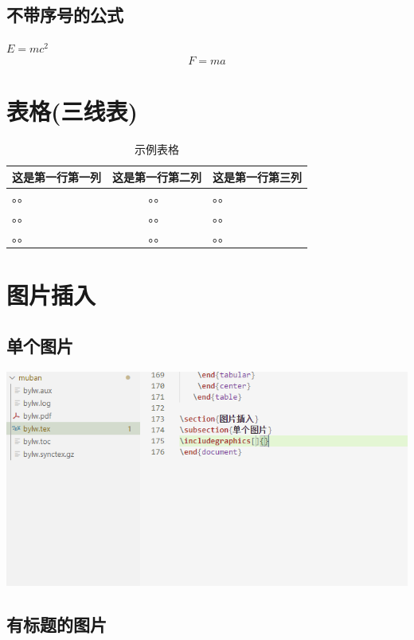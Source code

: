 \documentclass[12pt]{article}
\numberwithin{equation}{section}
\begin{document}
\subsection{不带序号的公式}
$E=mc^2$
\[ F=ma \]

\section{表格(三线表)}
\begin{table}[htbp] 
\setlength{\abovecaptionskip}{0.cm}
\setlength{\belowcaptionskip}{-0.9cm}
    \caption{ 示例表格} 
    \begin{center}
        \begin{tabular}{lcl} 
     \toprule 
     这是第一行第一列 & 这是第一行第二列 & 这是第一行第三列 \\ 
     \midrule 
    。。 & 。。 & 。。 \\ 
    。。 & 。。 & 。。 \\ 
    。。 & 。。 & 。。 \\ 
     \bottomrule 
    \end{tabular} 
    \end{center}
   \end{table}

\section{图片插入}
\subsection{单个图片}
\includegraphics[scale=0.8]{f1.PNG}
\newpage
\subsection{有标题的图片}
\end{document}
